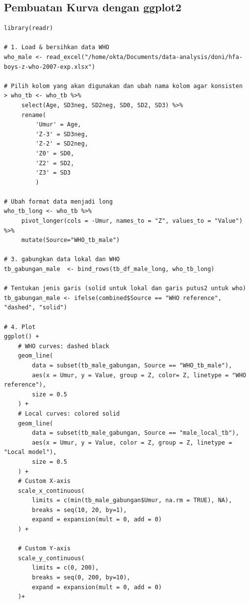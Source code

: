 \documentclass[11pt, a4paper]{article}
\begin{document}
\subsection{Pembuatan Kurva dengan ggplot2}
\begin{lstlisting}
library(readr)

# 1. Load & bersihkan data WHO 
who_male <- read_excel("/home/okta/Documents/data-analysis/doni/hfa-boys-z-who-2007-exp.xlsx") 

# Pilih kolom yang akan digunakan dan ubah nama kolom agar konsisten
> who_tb <- who_tb %>%
     select(Age, SD3neg, SD2neg, SD0, SD2, SD3) %>%
     rename(
         'Umur' = Age,
         'Z-3' = SD3neg,
         'Z-2' = SD2neg,
         'Z0' = SD0,
         'Z2' = SD2,
         'Z3' = SD3
         )

# Ubah format data menjadi long
who_tb_long <- who_tb %>%
     pivot_longer(cols = -Umur, names_to = "Z", values_to = "Value") %>%
     mutate(Source="WHO_tb_male")

# 3. gabungkan data lokal dan WHO
tb_gabungan_male  <- bind_rows(tb_df_male_long, who_tb_long)

# Tentukan jenis garis (solid untuk lokal dan garis putus2 untuk who)
tb_gabungan_male <- ifelse(combined$Source == "WHO reference", "dashed", "solid")

# 4. Plot
ggplot() +
    # WHO curves: dashed black
    geom_line(
        data = subset(tb_male_gabungan, Source == "WHO_tb_male"),
        aes(x = Umur, y = Value, group = Z, color= Z, linetype = "WHO reference"),
        size = 0.5
    ) +
    # Local curves: colored solid
    geom_line(
        data = subset(tb_male_gabungan, Source == "male_local_tb"),
        aes(x = Umur, y = Value, color = Z, group = Z, linetype = "Local model"),
        size = 0.5
    ) +
    # Custom X-axis
    scale_x_continuous(
        limits = c(min(tb_male_gabungan$Umur, na.rm = TRUE), NA),
        breaks = seq(10, 20, by=1),
        expand = expansion(mult = 0, add = 0)
    ) +
    
    # Custom Y-axis
    scale_y_continuous(
        limits = c(0, 200),
        breaks = seq(0, 200, by=10),
        expand = expansion(mult = 0, add = 0)
    )+
    

\end{lstlisting}
\end{document}

